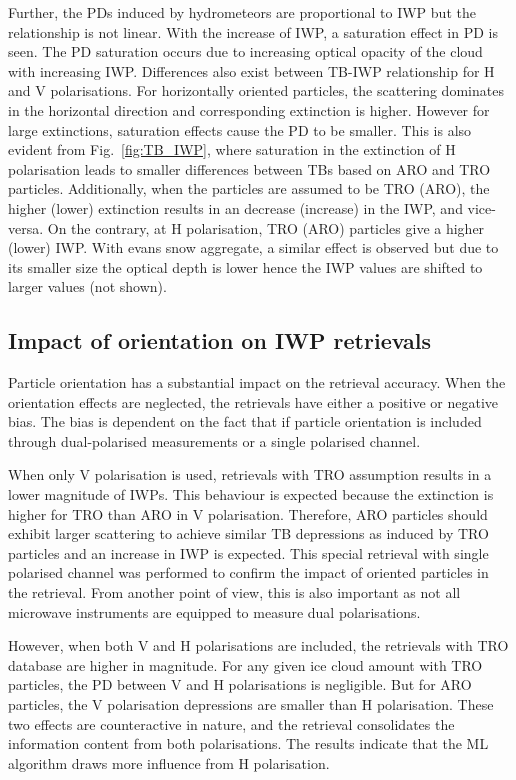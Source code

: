 \documentclass[amt, manuscript]{copernicus}
\begin{document}
Further, the PDs induced by hydrometeors are proportional to IWP but the relationship is not linear. With the increase of IWP, a saturation effect in PD is seen. The PD saturation occurs due to increasing optical opacity of the cloud with increasing IWP. Differences also exist between TB-IWP relationship for H and V polarisations. For horizontally oriented particles, the scattering dominates in the horizontal direction and corresponding extinction is higher. However for large extinctions, saturation effects cause the PD to be smaller. This is also evident from Fig.~\ref{fig:TB_IWP}, where saturation in the extinction of H  polarisation leads to smaller differences between TBs based on ARO and TRO particles. Additionally, when the particles are assumed to be TRO (ARO), the higher (lower) extinction results in an decrease (increase) in the IWP, and vice-versa. On the contrary, at H polarisation, TRO (ARO) particles give a higher (lower) IWP. With evans snow aggregate, a similar effect is observed but due to its smaller size the optical depth is lower hence the IWP values are shifted to larger values (not shown).


\subsection{Impact of orientation on IWP retrievals}
%
Particle orientation has a substantial impact on the retrieval accuracy. When the orientation effects are neglected, the retrievals have either a  positive or negative bias. The bias is dependent on the fact that if particle orientation is included through dual-polarised measurements or a single polarised channel. 

When only V polarisation is used, retrievals with TRO assumption results in a lower magnitude of IWPs. This behaviour is expected because the extinction is higher for TRO than ARO in V polarisation. Therefore, ARO particles should exhibit larger scattering to achieve similar TB depressions as induced by TRO particles and an increase in IWP is expected. This special retrieval with single polarised channel was performed to confirm the impact of oriented particles in the retrieval. From another point of view, this is also important as not all microwave instruments are equipped to measure dual polarisations.

However, when both V  and H  polarisations are included, the retrievals with TRO database are higher in magnitude. For any given ice cloud amount with TRO particles, the PD between V  and H  polarisations is negligible. But for ARO particles, the V polarisation depressions are smaller than H polarisation. These two effects are counteractive in nature, and the retrieval consolidates the information content from both polarisations. The results indicate that the ML algorithm draws more influence from H polarisation. 
\end{document}
